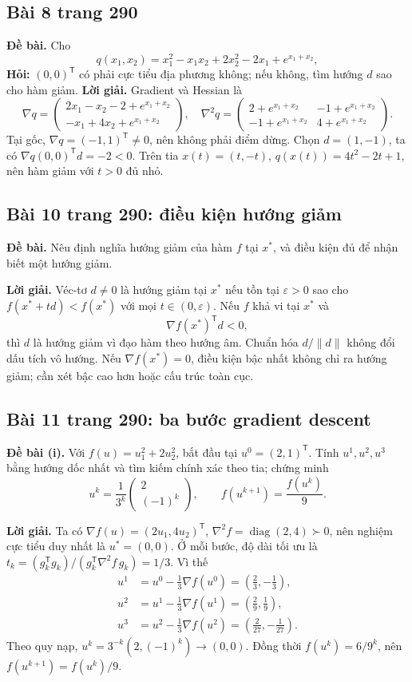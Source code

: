\documentclass[11pt,a4paper]{article}
\newcommand{\grad}{\nabla}
\newcommand{\Hess}{\nabla^2}
\newcommand{\T}{^{\mathsf T}}
\begin{document}
\subsection{Bài 8 trang 290}
\textbf{Đề bài.} Cho
\[
q(x_1,x_2)=x_1^2-x_1x_2+2x_2^2-2x_1+e^{x_1+x_2},
\]
\textbf{Hỏi:} \((0,0)\T\) có phải cực tiểu địa phương không; nếu không, tìm hướng \(d\) sao cho hàm giảm.
\textbf{Lời giải.} Gradient và Hessian là
\[
\grad q=
\begin{pmatrix}
2x_1-x_2-2+e^{x_1+x_2}\\
-x_1+4x_2+e^{x_1+x_2}
\end{pmatrix},
\quad
\Hess q=
\begin{pmatrix}
2+e^{x_1+x_2}&-1+e^{x_1+x_2}\\
-1+e^{x_1+x_2}&4+e^{x_1+x_2}
\end{pmatrix}.
\]
Tại gốc, \(\grad q=(-1,1)\T\ne0\), nên không phải điểm dừng. Chọn \(d=(1,-1)\), ta có \(\grad q(0,0)\T d=-2<0\). Trên tia \(x(t)=(t,-t)\), \(q(x(t))=4t^2-2t+1\), nên hàm giảm với \(t>0\) đủ nhỏ.

\subsection{Bài 10 trang 290: điều kiện hướng giảm}
\textbf{Đề bài.} Nêu định nghĩa hướng giảm của hàm \(f\) tại \(x^*\), và điều kiện đủ để nhận biết một hướng giảm.

\textbf{Lời giải.} Véc-tơ \(d\ne0\) là hướng giảm tại \(x^*\) nếu tồn tại \(\varepsilon>0\) sao cho \(f(x^*+td)<f(x^*)\) với mọi \(t\in(0,\varepsilon)\). Nếu \(f\) khả vi tại \(x^*\) và
\[
\grad f(x^*)\T d<0,
\]
thì \(d\) là hướng giảm vì đạo hàm theo hướng âm. Chuẩn hóa \(d/\|d\|\) không đổi dấu tích vô hướng. Nếu \(\grad f(x^*)=0\), điều kiện bậc nhất không chỉ ra hướng giảm; cần xét bậc cao hơn hoặc cấu trúc toàn cục.

\subsection{Bài 11 trang 290: ba bước gradient descent}
\textbf{Đề bài (i).} Với \(f(u)=u_1^2+2u_2^2\), bắt đầu tại \(u^0=(2,1)\T\). Tính \(u^1,u^2,u^3\) bằng hướng dốc nhất và tìm kiếm chính xác theo tia; chứng minh
\[
u^k=\frac1{3^k}\begin{pmatrix}2\\(-1)^k\end{pmatrix},\qquad f(u^{k+1})=\frac{f(u^k)}9.
\]

\textbf{Lời giải.} Ta có \(\grad f(u)=(2u_1,4u_2)\T\), \(\Hess f=\operatorname{diag}(2,4)\succ0\), nên nghiệm cực tiểu duy nhất là \(u^*=(0,0)\). Ở mỗi bước, độ dài tối ưu là \(t_k=(g_k\T g_k)/(g_k\T\Hess f\,g_k)=1/3\). Vì thế
\[
\begin{aligned}
u^1&=u^0-\tfrac13\grad f(u^0)=(\tfrac23,-\tfrac13),\\
u^2&=u^1-\tfrac13\grad f(u^1)=(\tfrac29,\tfrac19),\\
u^3&=u^2-\tfrac13\grad f(u^2)=(\tfrac2{27},-\tfrac1{27}).
\end{aligned}
\]
Theo quy nạp, \(u^k=3^{-k}(2,(-1)^k)\to(0,0)\). Đồng thời \(f(u^k)=6/9^k\), nên \(f(u^{k+1})=f(u^k)/9\).
\end{document}
